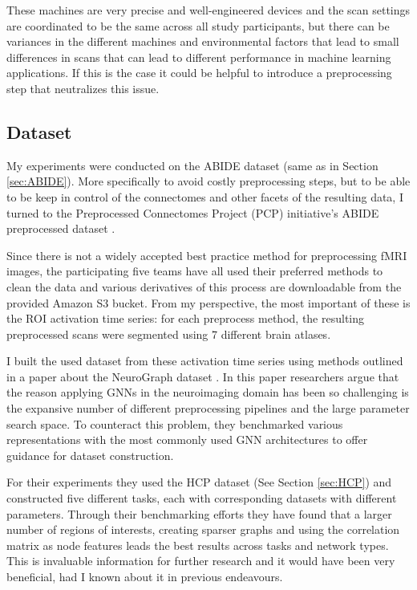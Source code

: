 	These machines are very precise and well-engineered devices and the scan settings are coordinated to be the same across all study participants, but there can be variances in the different machines and environmental factors that lead to small differences in scans \cite{sutton2008investigation} that can lead to different performance in machine learning applications. If this is the case it could be helpful to introduce a preprocessing step that neutralizes this issue.

	\subsection{Dataset}
	
	My experiments were conducted on the ABIDE dataset \cite{di2014autism} (same as in Section \ref{sec:ABIDE}). More specifically to avoid costly preprocessing steps, but to be able to be keep in control of the connectomes and other facets of the resulting data, I turned to the Preprocessed Connectomes Project (PCP) initiative's ABIDE preprocessed dataset \cite{craddock2013neuro}.
	
	Since there is not a widely accepted best practice method for preprocessing fMRI images, the participating five teams have all used their preferred methods to clean the data and various derivatives of this process are downloadable from the provided Amazon S3 bucket. From my perspective, the most important of these is the ROI activation time series: for each preprocess method, the resulting preprocessed scans were segmented using 7 different brain atlases. 
	
	I built the used dataset from these activation time series using methods outlined in a paper about the NeuroGraph dataset \cite{said2023neurograph}. In this paper researchers argue that the reason applying GNNs in the neuroimaging domain has been so challenging is the expansive number of different preprocessing pipelines and the large parameter search space. To counteract this problem, they benchmarked various representations with the most commonly used GNN architectures to offer guidance for dataset construction.
	
	For their experiments they used the HCP dataset (See Section \ref{sec:HCP}) and constructed five different tasks, each with corresponding datasets with different parameters. Through their benchmarking efforts they have found that a larger number of regions of interests, creating sparser graphs and using the correlation matrix as node features leads the best results across tasks and network types. This is invaluable information for further research and it would have been very beneficial, had I known about it in previous endeavours.
	
